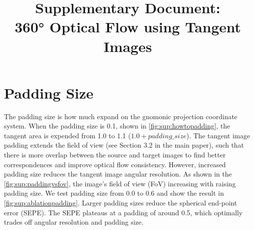 \documentclass{bmvc2k}
\title{Supplementary Document:\\ 360\!° Optical Flow using Tangent Images}
\begin{document}
\maketitle

%
%


%
%


\section{Padding Size}
\label{sec:sup:ablations}

The padding size is how much expand on the gnomonic projection coordinate system.
When the padding size is 0.1, shown in \cref{fig:sup:howtopadding}, the tangent area is expended from 1.0 to 1.1 ($1.0  + padding\_size$).
The tangent image padding extends the field of view  (see Section 3.2 in the main paper), such that there is more overlap between the source and target images to find better correspondences and improve optical flow consistency.
%
However, increased padding size reduces the tangent image angular resolution. 
%
As shown in the \cref{fig:sup:paddingvsfov}, the image's field of view (FoV) increasing with raising padding size.
%
We test padding size from 0.0 to 0.6 and show the result in \cref{fig:sup:ablationpadding}.
Larger padding sizes reduce the spherical end-point error (SEPE).
The SEPE plateaus at a padding of around 0.5, which optimally trades off angular resolution and padding size.
\end{document}
